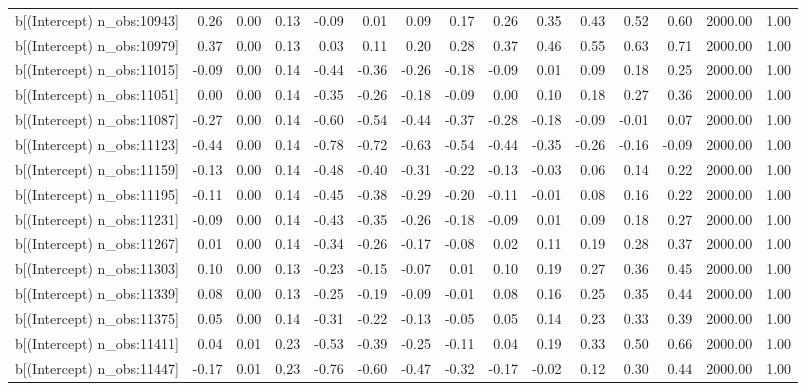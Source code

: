 \begin{table}[ht]
\begin{tabular}{rrrrrrrrrrrrrrr}
  b[(Intercept) n\_obs:10943] & 0.26 & 0.00 & 0.13 & -0.09 & 0.01 & 0.09 & 0.17 & 0.26 & 0.35 & 0.43 & 0.52 & 0.60 & 2000.00 & 1.00 \\ 
  b[(Intercept) n\_obs:10979] & 0.37 & 0.00 & 0.13 & 0.03 & 0.11 & 0.20 & 0.28 & 0.37 & 0.46 & 0.55 & 0.63 & 0.71 & 2000.00 & 1.00 \\ 
  b[(Intercept) n\_obs:11015] & -0.09 & 0.00 & 0.14 & -0.44 & -0.36 & -0.26 & -0.18 & -0.09 & 0.01 & 0.09 & 0.18 & 0.25 & 2000.00 & 1.00 \\ 
  b[(Intercept) n\_obs:11051] & 0.00 & 0.00 & 0.14 & -0.35 & -0.26 & -0.18 & -0.09 & 0.00 & 0.10 & 0.18 & 0.27 & 0.36 & 2000.00 & 1.00 \\ 
  b[(Intercept) n\_obs:11087] & -0.27 & 0.00 & 0.14 & -0.60 & -0.54 & -0.44 & -0.37 & -0.28 & -0.18 & -0.09 & -0.01 & 0.07 & 2000.00 & 1.00 \\ 
  b[(Intercept) n\_obs:11123] & -0.44 & 0.00 & 0.14 & -0.78 & -0.72 & -0.63 & -0.54 & -0.44 & -0.35 & -0.26 & -0.16 & -0.09 & 2000.00 & 1.00 \\ 
  b[(Intercept) n\_obs:11159] & -0.13 & 0.00 & 0.14 & -0.48 & -0.40 & -0.31 & -0.22 & -0.13 & -0.03 & 0.06 & 0.14 & 0.22 & 2000.00 & 1.00 \\ 
  b[(Intercept) n\_obs:11195] & -0.11 & 0.00 & 0.14 & -0.45 & -0.38 & -0.29 & -0.20 & -0.11 & -0.01 & 0.08 & 0.16 & 0.22 & 2000.00 & 1.00 \\ 
  b[(Intercept) n\_obs:11231] & -0.09 & 0.00 & 0.14 & -0.43 & -0.35 & -0.26 & -0.18 & -0.09 & 0.01 & 0.09 & 0.18 & 0.27 & 2000.00 & 1.00 \\ 
  b[(Intercept) n\_obs:11267] & 0.01 & 0.00 & 0.14 & -0.34 & -0.26 & -0.17 & -0.08 & 0.02 & 0.11 & 0.19 & 0.28 & 0.37 & 2000.00 & 1.00 \\ 
  b[(Intercept) n\_obs:11303] & 0.10 & 0.00 & 0.13 & -0.23 & -0.15 & -0.07 & 0.01 & 0.10 & 0.19 & 0.27 & 0.36 & 0.45 & 2000.00 & 1.00 \\ 
  b[(Intercept) n\_obs:11339] & 0.08 & 0.00 & 0.13 & -0.25 & -0.19 & -0.09 & -0.01 & 0.08 & 0.16 & 0.25 & 0.35 & 0.44 & 2000.00 & 1.00 \\ 
  b[(Intercept) n\_obs:11375] & 0.05 & 0.00 & 0.14 & -0.31 & -0.22 & -0.13 & -0.05 & 0.05 & 0.14 & 0.23 & 0.33 & 0.39 & 2000.00 & 1.00 \\ 
  b[(Intercept) n\_obs:11411] & 0.04 & 0.01 & 0.23 & -0.53 & -0.39 & -0.25 & -0.11 & 0.04 & 0.19 & 0.33 & 0.50 & 0.66 & 2000.00 & 1.00 \\ 
  b[(Intercept) n\_obs:11447] & -0.17 & 0.01 & 0.23 & -0.76 & -0.60 & -0.47 & -0.32 & -0.17 & -0.02 & 0.12 & 0.30 & 0.44 & 2000.00 & 1.00 \\ 

\end{tabular}
\end{table}
